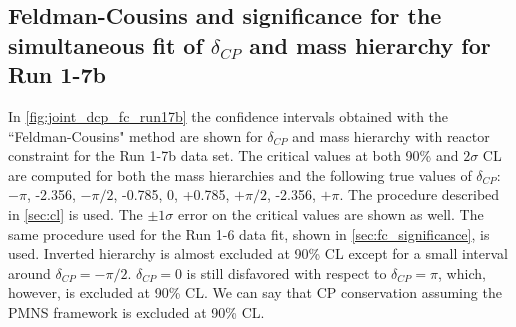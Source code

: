 %
%

\subsection {Feldman-Cousins and significance for the simultaneous fit of $\delta_{CP}$ and mass hierarchy for Run 1-7b}
\label{sec:fc_significance_run17b}


In \cref{fig:joint_dcp_fc_run17b} the confidence intervals obtained with the ``Feldman-Cousins" method
are shown for $\delta_{CP}$ and mass hierarchy with reactor constraint for the Run 1-7b data set.
The critical values at both 90\% and $2\sigma$ CL are computed
for both the mass hierarchies and the following true values of $\delta_{CP}$: 
$-\pi$, -2.356, $-\pi/2$, -0.785, 0, +0.785, $+\pi/2$, -2.356, $+\pi$. 
The procedure described in \cref{sec:cl} is used.
The $\pm 1 \sigma$ error on the critical values are shown as well.
The same procedure used for the Run 1-6 data fit, shown in \cref{sec:fc_significance}, is used.
Inverted hierarchy is almost excluded at 90\% CL except for a small interval around $\delta_{CP} = -\pi / 2$.
$\delta_{CP} = 0$ is still disfavored with respect to $\delta_{CP} = \pi$, which, however, is excluded at 90\% CL. 
We can say that CP conservation assuming the PMNS framework is excluded at 90\% CL. 

